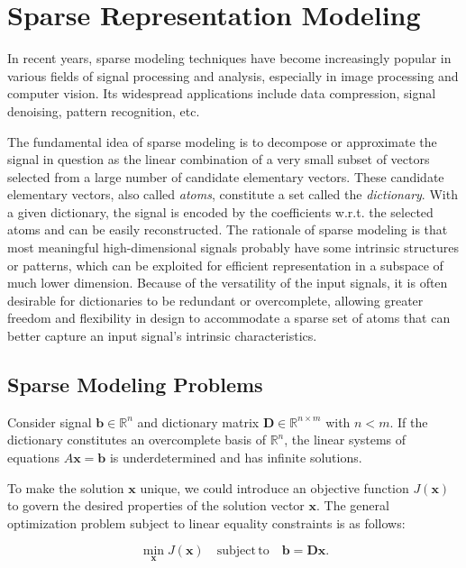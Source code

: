 \section{Sparse Representation Modeling}

In recent years, sparse modeling techniques have become
increasingly popular in various fields of signal processing and
analysis, especially in image processing and computer vision. Its
widespread applications include data compression, signal denoising,
pattern recognition, etc.

The fundamental idea of sparse modeling is to decompose or approximate the
signal in question as the linear combination of a very small subset of vectors
selected from a large number of candidate elementary vectors. These candidate
elementary vectors, also called \emph{atoms}, constitute a set called the
\emph{dictionary}. With a given dictionary, the signal is encoded by the
coefficients w.r.t. the selected atoms and can be easily reconstructed. The
rationale of sparse modeling is that most meaningful high-dimensional signals probably
have some intrinsic structures or patterns, which can be exploited for
efficient representation in a subspace of much lower dimension. Because of
the versatility of the input signals, it is often desirable for dictionaries to
be redundant or overcomplete, allowing greater freedom and flexibility in
design to accommodate a sparse set of atoms that can better capture
an input signal's intrinsic characteristics.

\subsection{Sparse Modeling Problems}

Consider signal $\mathbf{b}\in\mathbb{R}^n$ and dictionary matrix
$\mathbf{D}\in\mathbb{R}^{n\times m}$ with $n<m$. If the dictionary constitutes an
overcomplete basis of $\mathbb{R}^n$, the linear systems of
equations $A\mathbf{x}=\mathbf{b}$ is underdetermined and has infinite solutions.

To make the solution $\mathbf{x}$ unique, we could introduce an objective function
$J(\mathbf{x})$ to govern the desired properties of the solution vector $\mathbf{x}$.
The general optimization problem subject to linear equality constraints is as follows:

\begin{equation}
\label{eq:constrained-inverse}
\min_\mathbf{x} J(\mathbf{x}) \quad \mathrm{subject\,to} \quad \mathbf{b}=\mathbf{D}\mathbf{x}.
\end{equation}

